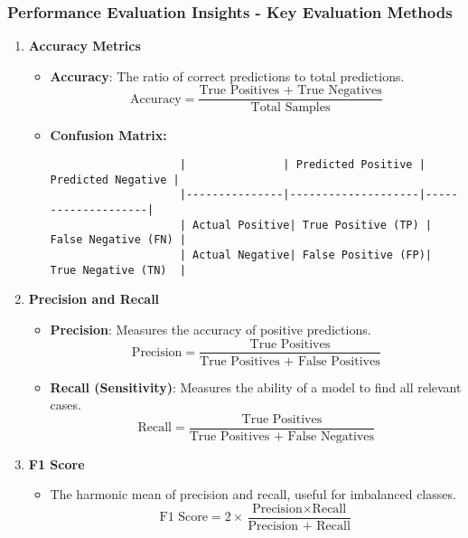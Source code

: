 \documentclass[aspectratio=169]{beamer}
\begin{document}
\begin{frame}[fragile]
    \frametitle{Performance Evaluation Insights - Key Evaluation Methods}
    \begin{enumerate}
        \item \textbf{Accuracy Metrics}
            \begin{itemize}
                \item \textbf{Accuracy}: The ratio of correct predictions to total predictions.
                    \begin{equation}
                        \text{Accuracy} = \frac{\text{True Positives + True Negatives}}{\text{Total Samples}}
                    \end{equation}
                \item \textbf{Confusion Matrix:}
                    \begin{lstlisting}
                    |               | Predicted Positive | Predicted Negative |
                    |---------------|--------------------|--------------------|
                    | Actual Positive| True Positive (TP) | False Negative (FN) |
                    | Actual Negative| False Positive (FP)| True Negative (TN)  |
                    \end{lstlisting}
            \end{itemize}
        
        \item \textbf{Precision and Recall}
            \begin{itemize}
                \item \textbf{Precision}: Measures the accuracy of positive predictions.
                    \begin{equation}
                        \text{Precision} = \frac{\text{True Positives}}{\text{True Positives + False Positives}}
                    \end{equation}
                \item \textbf{Recall (Sensitivity)}: Measures the ability of a model to find all relevant cases.
                    \begin{equation}
                        \text{Recall} = \frac{\text{True Positives}}{\text{True Positives + False Negatives}}
                    \end{equation}
            \end{itemize}
        
        \item \textbf{F1 Score}
            \begin{itemize}
                \item The harmonic mean of precision and recall, useful for imbalanced classes.
                    \begin{equation}
                        \text{F1 Score} = 2 \times \frac{\text{Precision} \times \text{Recall}}{\text{Precision + Recall}}
                    \end{equation}
            \end{itemize}
    \end{enumerate}
\end{frame}
\end{document}
